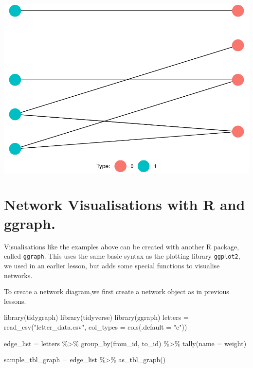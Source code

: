 \documentclass[
]{book}
\newenvironment{Shaded}{\begin{snugshade}}{\end{snugshade}}
\newcommand{\AttributeTok}[1]{\textcolor[rgb]{0.77,0.63,0.00}{#1}}
\newcommand{\FunctionTok}[1]{\textcolor[rgb]{0.00,0.00,0.00}{#1}}
\newcommand{\NormalTok}[1]{#1}
\newcommand{\OtherTok}[1]{\textcolor[rgb]{0.56,0.35,0.01}{#1}}
\newcommand{\SpecialCharTok}[1]{\textcolor[rgb]{0.00,0.00,0.00}{#1}}
\newcommand{\StringTok}[1]{\textcolor[rgb]{0.31,0.60,0.02}{#1}}
\begin{document}
\includegraphics{_main_files/figure-latex/unnamed-chunk-55-1.pdf}

\hypertarget{network-visualisations-with-r-and-ggraph.}{%
\section{Network Visualisations with R and ggraph.}\label{network-visualisations-with-r-and-ggraph.}}

Visualisations like the examples above can be created with another R package, called \texttt{ggraph}. This uses the same basic syntax as the plotting library \texttt{ggplot2}, we used in an earlier lesson, but adds some special functions to visualise networks.

To create a network diagram,we first create a network object as in previous lessons.

\begin{Shaded}
\begin{Highlighting}[]
\FunctionTok{library}\NormalTok{(tidygraph)}
\FunctionTok{library}\NormalTok{(tidyverse)}
\FunctionTok{library}\NormalTok{(ggraph)}
\NormalTok{letters }\OtherTok{=} \FunctionTok{read\_csv}\NormalTok{(}\StringTok{"letter\_data.csv"}\NormalTok{, }\AttributeTok{col\_types =} \FunctionTok{cols}\NormalTok{(}\AttributeTok{.default =} \StringTok{"c"}\NormalTok{))}

\NormalTok{edge\_list }\OtherTok{=}\NormalTok{ letters }\SpecialCharTok{\%\textgreater{}\%} 
  \FunctionTok{group\_by}\NormalTok{(from\_id, to\_id) }\SpecialCharTok{\%\textgreater{}\%} 
  \FunctionTok{tally}\NormalTok{(}\AttributeTok{name =} \StringTok{\textquotesingle{}weight\textquotesingle{}}\NormalTok{)}

\NormalTok{sample\_tbl\_graph }\OtherTok{=}\NormalTok{ edge\_list }\SpecialCharTok{\%\textgreater{}\%} 
  \FunctionTok{as\_tbl\_graph}\NormalTok{()}
\end{Highlighting}
\end{Shaded}
\end{document}

